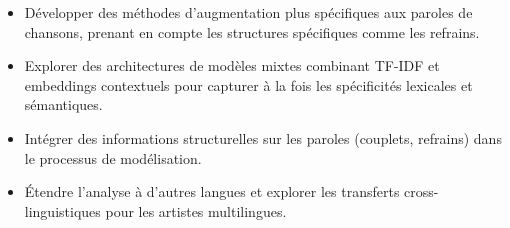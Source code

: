 \documentclass[a4paper,11pt]{article}
\begin{document}
\begin{itemize}
    \item Développer des méthodes d'augmentation plus spécifiques aux paroles de chansons, prenant en compte les structures spécifiques comme les refrains.
    \item Explorer des architectures de modèles mixtes combinant TF-IDF et embeddings contextuels pour capturer à la fois les spécificités lexicales et sémantiques.
    \item Intégrer des informations structurelles sur les paroles (couplets, refrains) dans le processus de modélisation.
    \item Étendre l'analyse à d'autres langues et explorer les transferts cross-linguistiques pour les artistes multilingues.
\end{itemize}
\end{document}
